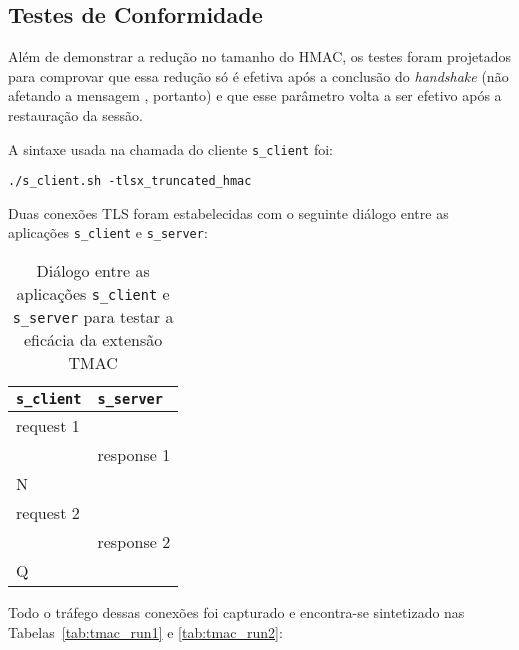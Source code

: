 \subsection{Testes de Conformidade}

Além de demonstrar a redução no tamanho do \acs{HMAC}, os testes foram 
projetados para comprovar que essa redução só é efetiva após a conclusão do 
\emph{handshake} (não afetando a mensagem \tlsHsF, portanto) e que esse parâmetro 
volta a ser efetivo após a restauração da sessão.

A sintaxe usada na chamada do cliente \verb|s_client| foi:

\begin{lstlisting}[caption={}]
./s_client.sh -tlsx_truncated_hmac
\end{lstlisting}

Duas conexões TLS foram estabelecidas com o seguinte diálogo entre as 
aplicações \verb|s_client| e \verb|s_server|:

\begin{table}[hbtp]
    \begin{center}
    \caption{Diálogo entre as aplicações \texttt{s\_client} e \texttt{s\_server} para testar a eficácia da extensão \acs{TMAC}}
    \label{tab:thmac_clnt_srvr_diag}
	\begin{tabular}{@{}ll@{}} \toprule
	\textbf{\texttt{\sf s\_client}} & \textbf{\texttt{\sf s\_server}} \\ \midrule
request 1 &		\\
	  & response 1	\\
N	  &		\\
request 2 &		\\
	  & response 2	\\
Q	  &		\\ \bottomrule
	\end{tabular}
    \end{center}
\end{table}

Todo o tráfego dessas conexões foi capturado e encontra-se sintetizado nas 
Tabelas~\ref{tab:tmac_run1} e \ref{tab:tmac_run2}:

